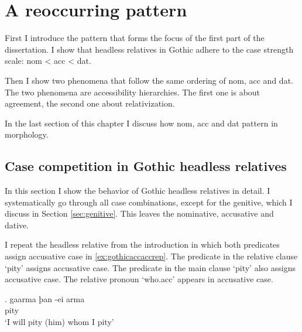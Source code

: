 
\chapter{A reoccurring pattern}

First I introduce the pattern that forms the focus of the first part of the dissertation. I show that headless relatives in Gothic adhere to the case strength scale: \ac{nom} < \ac{acc} < \ac{dat}.

Then I show two phenomena that follow the same ordering of \ac{nom}, \ac{acc} and \ac{dat}. The two phenomena are accessibility hierarchies. The first one is about agreement, the second one about relativization.

In the last section of this chapter I discuss how \ac{nom}, \ac{acc} and \ac{dat} pattern in morphology.


\section{Case competition in Gothic headless relatives}

In this section I show the behavior of Gothic headless relatives in detail. I systematically go through all case combinations, except for the genitive, which I discuss in Section \ref{sec:genitive}. This leaves the nominative, accusative and dative.

I repeat the headless relative from the introduction in which both predicates assign accusative case in \ref{ex:gothicaccaccrep}. The predicate in the relative clause  `pity' assigns accusative case. The predicate in the main clause  `pity' also assigns accusative case. The relative pronoun  `who.\ac{acc}' appears in accusative case.

\exg. gaarma þan -ei arma\\
 pity\scsub{[acc]}   \\
 `I will pity (him) whom I pity' \label{ex:gothicaccaccrep}

%

